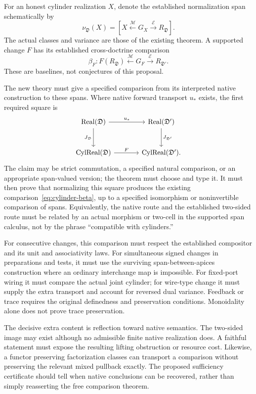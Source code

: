 \documentclass[11pt]{article}
\theoremstyle{remark}
\newcommand{\Real}{\operatorname{Real}}
\begin{document}
For an honest cylinder realization $X$, denote the established normalization span schematically by
\begin{equation}
 \nu_{\mathfrak D}(X)=
 \left[X\xleftarrow{\mathcal M}G_X
             \xrightarrow{\mathcal E}R_{\mathfrak D}\right].
 \label{eq:normalization-span}
\end{equation}
The actual classes and variance are those of the existing theorem. A supported change $F$ has its established cross-doctrine comparison
\begin{equation}
 \beta_F:
 F(R_{\mathfrak D})\xleftarrow{\mathcal M}G_F
                \xrightarrow{\mathcal E}R_{\mathfrak D'}.
 \label{eq:cylinder-beta}
\end{equation}
These are baselines, not conjectures of this proposal.

The new theory must give a specified comparison from its interpreted native construction to these spans. Where native forward transport $u_*$ exists, the first required square is
\[
\begin{tikzcd}[column sep=large,row sep=large]
\Real(\mathfrak D) \arrow[r,"u_*"] \arrow[d,"J_{\mathfrak D}"'] &
\Real(\mathfrak D') \arrow[d,"J_{\mathfrak D'}"] \\
\operatorname{CylReal}(\mathfrak D) \arrow[r,"F"] &
\operatorname{CylReal}(\mathfrak D').
\end{tikzcd}
\]
The claim may be strict commutation, a specified natural comparison, or an appropriate span-valued version; the theorem must choose and type it. It must then prove that normalizing this square produces the existing comparison~\eqref{eq:cylinder-beta}, up to a specified isomorphism or noninvertible comparison of spans. Equivalently, the native route and the established two-sided route must be related by an actual morphism or two-cell in the supported span calculus, not by the phrase ``compatible with cylinders.''

For consecutive changes, this comparison must respect the established compositor and its unit and associativity laws. For simultaneous signed changes in preparations and tests, it must use the surviving span-between-apices construction where an ordinary interchange map is impossible. For fixed-port wiring it must compare the actual joint cylinder; for wire-type change it must supply the extra transport and account for reversed dual variance. Feedback or trace requires the original definedness and preservation conditions. Monoidality alone does not prove trace preservation.

The decisive extra content is reflection toward native semantics. The two-sided image may exist although no admissible finite native realization does. A faithful statement must expose the resulting lifting obstruction or resource cost. Likewise, a functor preserving factorization classes can transport a comparison without preserving the relevant mixed pullback exactly. The proposed sufficiency certificate should tell when native conclusions can be recovered, rather than simply reasserting the free comparison theorem.
\end{document}
